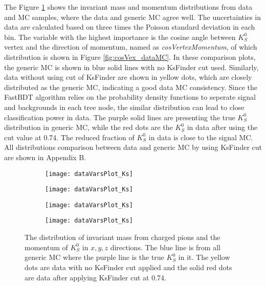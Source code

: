  The Figure \ref{fig:ksvalid_1} shows the invariant mass and momentum distributions from data and MC samples, where the data and generic MC agree well. The uncertainties in data are calculated based on three times the Poisson standard deviation in each bin. The variable with the highest importance is the cosine angle between $K_S^0$ vertex and the direction of momentum, named as \textit{cosVertexMomentum}, of which distribution is shown in Figure \ref{fig:cosVex_dataMC}. In these comparison plots, the generic MC is shown in blue solid lines with no KsFinder cut used. Similarly, data without using cut of KsFinder are shown in yellow dots, which are closely distributed as the generic MC, indicating a good data MC consistency. Since the FastBDT algorithm relies on the probability density functions to seperate signal and backgrounds in each tree node, the similar distribution can lead to close classification power in data. The purple solid lines are presenting the true $K_S^0$ distribution in generic MC, while the red dots are the $K_S^0$ in data after using the cut value at 0.74. The reduced fraction of $K_S^0$ in data  is close to the signal MC. All distributions comparison between data and generic MC by using KsFinder cut are shown in Appendix B.

\begin{figure}[htpb]
\begin{subfigure}{0.5\linewidth}
\texttt{[image: dataVarsPlot\_Ks]}
\end{subfigure}
\begin{subfigure}{0.5\linewidth}
\texttt{[image: dataVarsPlot\_Ks]}
\end{subfigure}
\bigskip
\begin{subfigure}{0.5\linewidth}
\texttt{[image: dataVarsPlot\_Ks]}
\end{subfigure}
\begin{subfigure}{0.5\linewidth}
\texttt{[image: dataVarsPlot\_Ks]}
\end{subfigure}
\caption{The distribution of invariant mass from charged pions and the momentum of $K_S^0$ in $x,y,z$ directions. The blue line is from all generic MC where the purple line is the true $K_S^0$ in it. The yellow dots are data with no KsFinder cut applied and the solid red dots are data after applying KsFinder cut at 0.74.}
\label{fig:ksvalid_1}
\end{figure}

